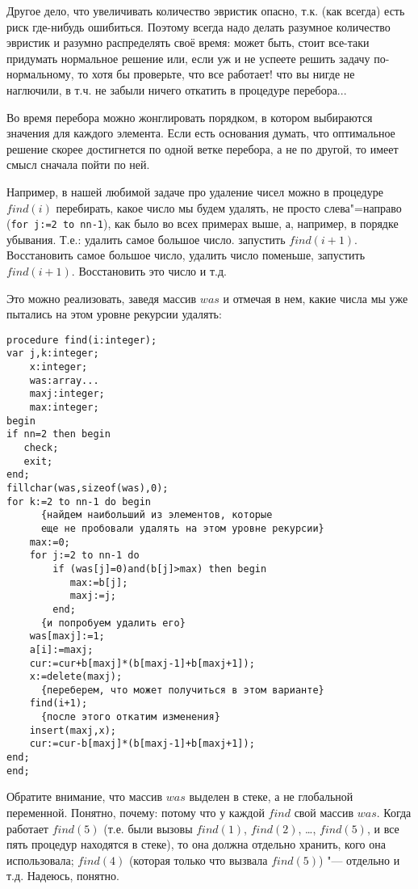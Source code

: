 Другое дело, что увеличивать количество эвристик опасно, т.к. (как всегда) есть риск где-нибудь ошибиться. Поэтому всегда надо делать разумное количество эвристик и разумно распределять своё время: может быть, стоит все-таки придумать нормальное решение или, если уж и не успеете решить задачу 
по-нормальному, то хотя бы проверьте, что все работает! что вы нигде не наглючили, в т.ч. не забыли ничего откатить в процедуре перебора...


Во время перебора можно жонглировать порядком, в котором выбираются значения для каждого 
элемента. Если есть основания думать, что оптимальное решение скорее достигнется по одной ветке перебора, а не по другой, то имеет смысл сначала пойти по ней.

Например, в нашей любимой задаче про удаление чисел можно в процедуре $find(i)$ перебирать, какое число мы 
будем удалять, не просто слева"=направо (\texttt{for j:=2 to nn-1}), как было во всех примерах выше, а, например, в порядке убывания. Т.е.: удалить самое большое число. запустить $find(i+1)$. 
Восстановить самое большое число, удалить число поменьше, запустить $find(i+1)$. Восстановить это число и т.д. 

Это можно реализовать, заведя массив $was$ и отмечая в нем, какие числа мы уже пытались на этом 
уровне рекурсии удалять:

\begin{codesample}\begin{verbatim}
procedure find(i:integer);
var j,k:integer;
    x:integer;
    was:array...
    maxj:integer;
    max:integer;
begin
if nn=2 then begin
   check;
   exit;
end;
fillchar(was,sizeof(was),0);
for k:=2 to nn-1 do begin
      {найдем наибольший из элементов, которые 
      еще не пробовали удалять на этом уровне рекурсии}
    max:=0;  
    for j:=2 to nn-1 do 
        if (was[j]=0)and(b[j]>max) then begin
           max:=b[j];
           maxj:=j;
        end;
      {и попробуем удалить его}
    was[maxj]:=1;
    a[i]:=maxj;
    cur:=cur+b[maxj]*(b[maxj-1]+b[maxj+1]);
    x:=delete(maxj);
      {переберем, что может получиться в этом варианте}
    find(i+1);
      {после этого откатим изменения}
    insert(maxj,x);
    cur:=cur-b[maxj]*(b[maxj-1]+b[maxj+1]);
end;
end;
\end{verbatim}\end{codesample}

Обратите внимание, что массив $was$ выделен в стеке, а не глобальной переменной. Понятно, 
почему: потому что у каждой $find$ свой массив $was$. Когда работает $find(5)$ (т.е. были вызовы $find(1)$, $find(2)$, \dots, $find(5)$, и все пять процедур находятся в стеке), то она должна отдельно 
хранить, кого она использовала; $find(4)$ (которая только что вызвала $find(5)$) "--- отдельно и т.д. Надеюсь, понятно.

